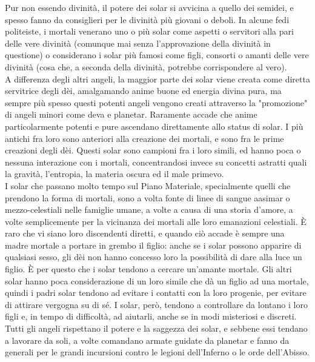 \begin{multicols}{2}
Pur non essendo divinità, il potere dei solar si avvicina a quello dei semidei, e spesso fanno da consiglieri per le divinità più giovani o deboli. In alcune fedi politeiste, i mortali venerano uno o più solar come aspetti o servitori alla pari delle vere divinità (comunque mai senza l'approvazione della divinità in questione) o considerano i solar più famosi come figli, consorti o amanti delle vere divinità (cosa che, a seconda della divinità, potrebbe corrispondere al vero).\\
A differenza degli altri angeli, la maggior parte dei solar viene creata come diretta servitrice degli dèi, amalgamando anime buone ed energia divina pura, ma sempre più spesso questi potenti angeli vengono creati attraverso la "promozione" di angeli minori come deva e planetar. Raramente accade che anime particolarmente potenti e pure ascendano direttamente allo status di solar. I più antichi fra loro sono anteriori alla creazione dei mortali, e sono fra le prime creazioni degli dèi. Questi solar sono campioni fra i loro simili, ed hanno poca o nessuna interazione con i mortali, concentrandosi invece su concetti astratti quali la gravità, l'entropia, la materia oscura ed il male primevo.\\
I solar che passano molto tempo sul Piano Materiale, specialmente quelli che prendono la forma di mortali, sono a volta fonte di linee di sangue aasimar o mezzo-celestiali nelle famiglie umane, a volte a causa di una storia d'amore, a volte semplicemente per la vicinanza dei mortali alle loro emanazioni celestiali. È raro che vi siano loro discendenti diretti, e quando ciò accade è sempre una madre mortale a portare in grembo il figlio: anche se i solar possono apparire di qualsiasi sesso, gli dèi non hanno concesso loro la possibilità di dare alla luce un figlio. È per questo che i solar tendono a cercare un'amante mortale. Gli altri solar hanno poca considerazione di un loro simile che dà un figlio ad una mortale, quindi i padri solar tendono ad evitare i contatti con la loro progenie, per evitare di attirare vergogna su di sé. I solar, però, tendono a controllare da lontano i loro figli e, in tempo di difficoltà, ad aiutarli, anche se in modi misteriosi e discreti.\\
Tutti gli angeli rispettano il potere e la saggezza dei solar, e sebbene essi tendano a lavorare da soli, a volte comandano armate guidate da planetar e fanno da generali per le grandi incursioni contro le legioni dell'Inferno o le orde dell'Abisso.\\



\end{multicols}
